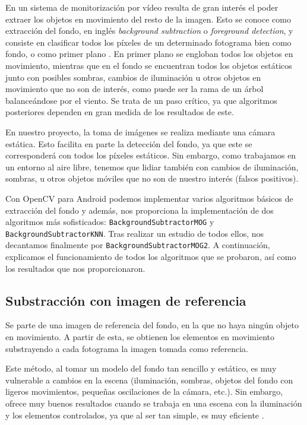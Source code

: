 En un sistema de monitorización por vídeo resulta de gran interés el
poder extraer los objetos en movimiento del resto de la imagen. Esto se
conoce como extracción del fondo, en inglés \emph{background
subtraction} o \emph{foreground detection}, y consiste en clasificar
todos los píxeles de un determinado fotograma bien como fondo, o como
primer plano \citep{wiki:bs}. En primer plano se engloban todos los
objetos en movimiento, mientras que en el fondo se encuentran todos los
objetos estáticos junto con posibles sombras, cambios de iluminación u
otros objetos en movimiento que no son de interés, como puede ser la
rama de un árbol balanceándose por el viento. Se trata de un paso
crítico, ya que algoritmos posteriores dependen en gran medida de los
resultados de este.

En nuestro proyecto, la toma de imágenes se realiza mediante una cámara
estática. Esto facilita en parte la detección del fondo, ya que este se
corresponderá con todos los píxeles estáticos. Sin embargo, como
trabajamos en un entorno al aire libre, tenemos que lidiar también con
cambios de iluminación, sombras, u otros objetos móviles que no son de
nuestro interés (falsos positivos).

Con OpenCV para Android podemos implementar varios algoritmos básicos de
extracción del fondo y además, nos proporciona la implementación de dos
algoritmos más sofisticados: \texttt{BackgroundSubtractorMOG} y
\texttt{BackgroundSubtractorKNN}. Tras realizar un estudio de todos
ellos, nos decantamos finalmente por \texttt{BackgroundSubtractorMOG2}.
A continuación, explicamos el funcionamiento de todos los algoritmos que
se probaron, así como los resultados que nos proporcionaron.

\subsection{Substracción con imagen de referencia}\label{substraccion-con-imagen-de-referencia}

Se parte de una imagen de referencia del fondo, en la que no haya ningún
objeto en movimiento. A partir de esta, se obtienen los elementos en
movimiento substrayendo a cada fotograma la imagen tomada como
referencia.

Este método, al tomar un modelo del fondo tan sencillo y estático, es
muy vulnerable a cambios en la escena (iluminación, sombras, objetos del
fondo con ligeros movimientos, pequeñas oscilaciones de la cámara,
etc.). Sin embargo, ofrece muy buenos resultados cuando se trabaja en
una escena con la iluminación y los elementos controlados, ya que al ser
tan simple, es muy eficiente \citep{programarfacil:detmov}.

